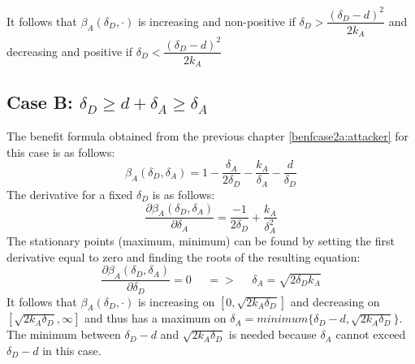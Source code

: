 It follows that $\beta_{A}(\delta_{D},\cdot)$ is increasing and non-positive if $\delta_{D}> \dfrac{(\delta_{D}-d)^{2}}{2k_{A}}$ and decreasing and positive if $\delta_{D} < \dfrac{(\delta_{D}-d)^{2}}{2k_{A}}$  \\

\subsection*{Case B: $\delta_{D} \geq d+\delta_{A} \geq \delta_{A} $ }
The benefit formula obtained from the previous chapter \ref{benfcase2a:attacker} for this case is as follows:
\begin{equation*}
\beta_{A}(\delta_{D},\delta_{A}) =1- \dfrac{\delta_{A}}{2\delta_{D}} - \dfrac{k_{A}}{\delta_{A}} - \dfrac{d}{\delta_{D}}
\end{equation*}
The derivative for a fixed $\delta_{D}$ is as follows:
\begin{equation*}
\dfrac{\partial \beta_{A}(\delta_{D},\delta_{A})}{\partial \delta_{A}} = \dfrac{-1}{2\delta_{D}} + \dfrac{k_{A}}{\delta_{A}^{2}}
\end{equation*}
The stationary points (maximum, minimum) can be found by setting the first derivative equal to zero and finding the roots of the resulting equation:
\begin{equation*}
\frac{\partial \beta_{A}(\delta_{D},\delta_{A})}{\partial \delta_{D}} =0 ~~~~~~ =>~~~~~~ \delta_{A} = \sqrt{2\delta_{D}k_{A}}
\end{equation*}
It follows that $\beta_{A}(\delta_{D},\cdot)$ is increasing on $[0,\sqrt{2k_{A}\delta_{D}}]$ and decreasing on $[\sqrt{2k_{A}\delta_{D}}, \infty]$ and thus has a maximum on $\delta_{A} = minimum \{\delta_{D} -d, \sqrt{2k_{A}\delta_{D}} \} $. The minimum between $\delta_{D}-d$ and $ \sqrt{2k_{A}\delta_{D}}$ is needed because $\delta_{A} $ cannot exceed $\delta_{D}-d$ in this case. \\

